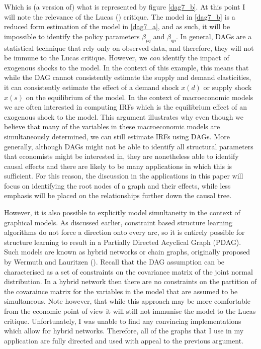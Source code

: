 \documentclass{article}
\begin{document}
Which is (a version of) what is represented by figure \ref{dag7_b}. At this point I will note the relevance of the Lucas (\citeyear{lucas1976econometric}) critique. The model in \ref{dag7_b} is a reduced form estimation of the model in \ref{dag7_a}, and as such, it will be impossible to identify the policy parameters $\beta_{pq}$ and $\beta_{qp}$. In general, DAGs are a statistical technique that rely only on observed data, and therefore, they will not be immune to the Lucas critique. However, we \textit{can} identify the impact of exogenous shocks to the model. In the context of this example, this means that while the DAG cannot consistently estimate the supply and demand elasticities, it can consistently estimate the effect of a demand shock $x(d)$ or supply shock $x(s)$ on the equilibrium of the model. In the context of macroeconomic models we are often interested in computing IRFs which is the equilibrium effect of an exogenous shock to the model. This argument illustrates why even though we believe that many of the variables in these macroeconomic models are simultaneously determined, we can still estimate IRFs using DAGs. More generally, although DAGs might not be able to identify all structural parameters that economists might be interested in, they are nonetheless able to identify causal effects and there are likely to be many applications in which this is sufficient. For this reason, the discussion in the applications in this paper will focus on identifying the root nodes of a graph and their effects, while less emphasis will be placed on the relationships further down the causal tree.

However, it is also possible to explicitly model simultaneity in the context of graphical models. As discussed earlier, constraint based structure learning algorithms do not force a direction onto every arc, so it is entirely possible for structure learning to result in a Partially Directed Acyclical Graph (PDAG). Such models are known as hybrid networks or chain graphs, originally proposed by Wermuth and Lauritzen (\citeyear{wermuth1990substantive}). Recall that the DAG assumption can be characterised as a set of constraints on the covariance matrix of the joint normal distribution. In a hybrid network then there are no constraints on the partition of the covaraince matrix for the variables in the model that are assumed to be simultaneous. Note however, that while this approach may be more comfortable from the economic point of view it will still not immunise the model to the Lucas critique. Unfortunately, I was unable to find any convincing implementations which allow for hybrid networks. Therefore, all of the graphs that I use in my application are fully directed and used with appeal to the previous argument.
\end{document}
